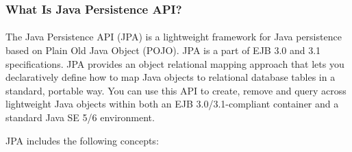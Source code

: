 \subsubsection{What Is Java Persistence API?}
\paragraph{}
The Java Persistence API (JPA) is a lightweight framework for Java persistence based on Plain Old Java Object (POJO). JPA is a part of EJB 3.0 and 3.1 specifications. JPA provides an object relational mapping approach that lets you declaratively define how to map Java objects to relational database tables in a standard, portable way. You can use this API to create, remove and query across lightweight Java objects within both an EJB 3.0/3.1-compliant container and a standard Java SE 5/6 environment.

JPA includes the following concepts:

